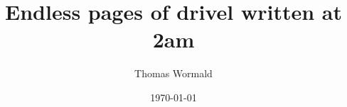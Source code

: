 \documentclass[authoryearcitations]{UoYCSproject}
\title{Endless pages of drivel written at 2am}
\author{Thomas Wormald}
\date{\today}
\begin{document}
\maketitle
\listoffigures
\listoftables
\lstlistoflistings

\label{sec:start}












\appendix


\end{document}

